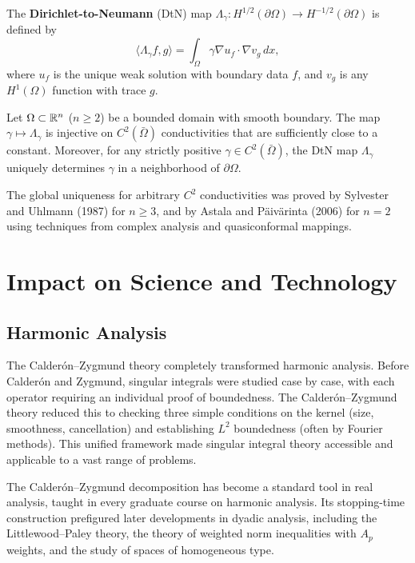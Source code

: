 \begin{definition}
The \textbf{Dirichlet-to-Neumann} (DtN) map $\Lambda_\gamma: H^{1/2}(\partial\Omega) \to H^{-1/2}(\partial\Omega)$ is defined by
\[
\langle \Lambda_\gamma f, g \rangle = \int_\Omega \gamma \nabla u_f \cdot \nabla v_g \,dx,
\]
where $u_f$ is the unique weak solution with boundary data $f$, and $v_g$ is any $H^1(\Omega)$ function with trace $g$.
\end{definition}

\begin{theorem}
Let $\Omega \subset \mathbb{R}^n$ ($n \geq 2$) be a bounded domain with smooth boundary. The map $\gamma \mapsto \Lambda_\gamma$ is injective on $C^2(\bar\Omega)$ conductivities that are sufficiently close to a constant. Moreover, for any strictly positive $\gamma \in C^2(\bar\Omega)$, the DtN map $\Lambda_\gamma$ uniquely determines $\gamma$ in a neighborhood of $\partial\Omega$.
\end{theorem}

\begin{remark}
The global uniqueness for arbitrary $C^2$ conductivities was proved by Sylvester and Uhlmann (1987) for $n \geq 3$, and by Astala and P\"aiv\"arinta (2006) for $n = 2$ using techniques from complex analysis and quasiconformal mappings.
\end{remark}

\section{Impact on Science and Technology}

\subsection{Harmonic Analysis}

The Calder\'{o}n--Zygmund theory completely transformed harmonic analysis. Before Calder\'{o}n and Zygmund, singular integrals were studied case by case, with each operator requiring an individual proof of boundedness. The Calder\'{o}n--Zygmund theory reduced this to checking three simple conditions on the kernel (size, smoothness, cancellation) and establishing $L^2$ boundedness (often by Fourier methods). This unified framework made singular integral theory accessible and applicable to a vast range of problems.

The Calder\'{o}n--Zygmund decomposition has become a standard tool in real analysis, taught in every graduate course on harmonic analysis. Its stopping-time construction prefigured later developments in dyadic analysis, including the Littlewood--Paley theory, the theory of weighted norm inequalities with $A_p$ weights, and the study of spaces of homogeneous type.

